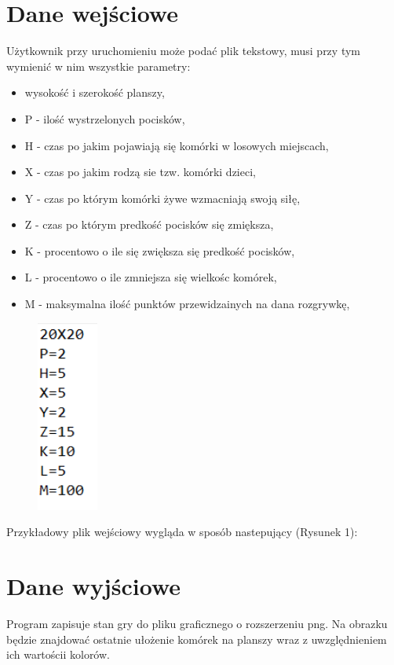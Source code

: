 \documentclass{article}
\begin{document}
\section{Dane wejściowe}
{\fontsize{14}{14}\selectfont 
Użytkownik przy uruchomieniu może podać plik tekstowy, musi przy tym wymienić w nim wszystkie parametry:
\begin{itemize}
\item wysokość i szerokość planszy,
\item P - ilość wystrzelonych pocisków,
\item H - czas po jakim pojawiają się komórki w losowych miejscach,
\item X - czas po jakim rodzą sie tzw. komórki dzieci, 
\item Y - czas po którym komórki żywe wzmacniają swoją siłę,
\item Z - czas po którym predkość pocisków się zmiększa,
\item K - procentowo o ile się zwiększa się predkość pocisków,
\item L - procentowo o ile zmniejsza się wielkośc komórek,
\item M - maksymalna ilość punktów przewidzainych na dana rozgrywkę,
\end{itemize}

\begin{figure}[h]
\centering
\includegraphics[width=2cm]{dane.png}
\caption{}
\label{fig:obrazek }
\end{figure}
}
Przykładowy plik wejściowy wygląda w sposób nastepujący (Rysunek 1):
\newpage
{}
\section{Dane wyjściowe}
{\fontsize{14}{14}\selectfont 
Program zapisuje stan gry do pliku graficznego o rozszerzeniu png. Na obrazku będzie znajdować ostatnie ułożenie komórek na planszy wraz z uwzględnieniem ich wartościi kolorów.
}
\end{document}
